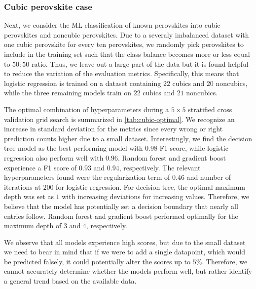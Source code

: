 \subsubsection{Cubic perovskite case}


Next, we consider the ML classification of known perovskites into cubic perovskites and noncubic perovskites. Due to a severaly imbalanced dataset with one cubic perovskite for every ten perovskites, we randomly pick perovskites to include in the training set such that the class balance becomes more or less equal to $50:50$ ratio. Thus, we leave out a large part of the data but it is found helpful to reduce the variation of the evaluation metrics. Specifically, this means that logistic regression is trained on a dataset containing $22$ cubics and $20$ noncubics, while the three remaining models train on $22$ cubics and $21$ noncubics.

The optimal combination of hyperparameters during a $5\times 5$ stratified cross validation grid search is summarized in \autoref{tab:cubic-optimal}. We recognize an increase in standard deviation for the metrics since every wrong or right prediction counts higher due to a small dataset. Interestingly, we find the decision tree model as the best performing model with $0.98$ F1 score, while logistic regression also perform well with $0.96$. Random forest and gradient boost experience a F1 score of $0.93$ and $0.94$, respectively. The relevant hyperparameters found were the regularization term of $0.46$ and number of iterations at $200$ for logistic regression. For decision tree, the optimal maximum depth was set as $1$ with increasing deviations for increasing values. Therefore, we believe that the model has potentially set a decision boundary that nearly all entries follow. Random forest and gradient boost performed optimally for the maximum depth of $3$ and $4$, respectively.

We observe that all models experience high scores, but due to the small dataset we need to bear in mind that if we were to add a single datapoint, which would be predicted falsely, it could potentially alter the scores up to $5\%$. Therefore, we cannot accurately determine whether the models perform well, but rather identify a general trend based on the available data.


